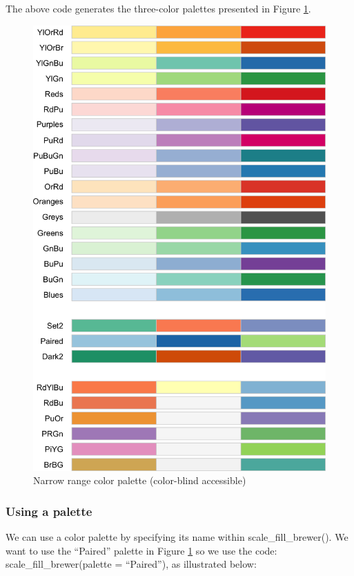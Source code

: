 \documentclass[
]{krantz}
\begin{document}
The above code generates the three-color palettes presented in Figure \ref{fig:colorspalthree}.

\begin{figure}
\includegraphics[width=0.7\linewidth,height=0.7\textheight]{ch_graphing/images/colors_3} \caption{Narrow range color palette (color-blind accessible)}\label{fig:colorspalthree}
\end{figure}

\newpage

\hypertarget{using-a-palette}{%
\subsubsection{Using a palette}\label{using-a-palette}}

We can use a color palette by specifying its name within scale\_fill\_brewer(). We want to use the ``Paired'' palette in Figure \ref{fig:colorspalthree} so we use the code: scale\_fill\_brewer(palette = ``Paired''), as illustrated below:
\end{document}
